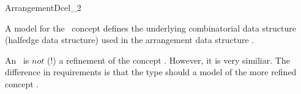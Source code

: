 
\ccRefPageBegin


\begin{ccRefConcept}{ArrangementDcel_2}

\ccDefinition
   A model for the \ccRefName\ concept defines the underlying
   combinatorial data structure (halfedge data structure) used in the
   arrangement data structure .

    An \ccRefName\ is $not$ (!) a refinement of the
     concept . However, it is very similiar.  The
    difference in requirements is that the
     type
    should a model of the more refined concept
    .

\ccTypes

\ccHasModels


\end{ccRefConcept}

\ccRefPageEnd

